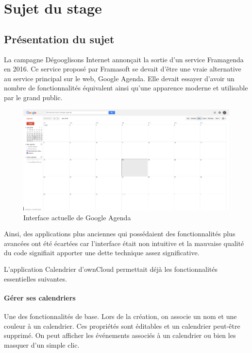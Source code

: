 \documentclass[10pt,a4paper]{report}
\begin{document}
	\chapter{Sujet du stage}
	
	\section{Présentation du sujet}
	
	La campagne Dégooglisons Internet annonçait la sortie d'un service Framagenda en 2016. Ce service proposé par Framasoft se devait d'être une vraie alternative au service principal sur le web, Google Agenda. Elle devait essayer d'avoir un nombre de fonctionnalités équivalent ainsi qu'une apparence moderne et utilisable par le grand public.
	
	\begin{figure}[ht]
		\centering
		\centerline{\includegraphics[width=1.5\textwidth]{images/google-agenda-interface-actuelle.png}}
		\caption*{Interface actuelle de Google Agenda}
		\label{normal_case}
	\end{figure}
	
	Ainsi, des applications plus anciennes qui possédaient des fonctionnalités plus avancées ont été écartées car l'interface était non intuitive et la mauvaise qualité du code signifiait apporter une dette technique assez significative.
	
	L'application Calendrier d'ownCloud permettait déjà les fonctionnalités essentielles suivantes.
	
	\subsubsection{Gérer ses calendriers}
	Une des fonctionnalités de base. Lors de la création, on associe un nom et une couleur à un calendrier. Ces propriétés sont éditables et un calendrier peut-être supprimé. On peut afficher les événements associés à un calendrier ou bien les masquer d'un simple clic.
	
\end{document}
